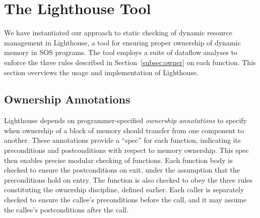 \section{The Lighthouse Tool}
\label{sec:alg}

We have instantiated our approach to static checking of dynamic
resource management in Lighthouse, a tool for ensuring proper
ownership of dynamic memory in SOS programs.  The tool employs a suite
of dataflow analyses to enforce the three rules described in
Section~\ref{subsec:owner} on each function.  
This section overviews the usage and implementation of Lighthouse.





\subsection{Ownership Annotations}

Lighthouse depends on programmer-specified 
{\em ownership annotations} to specify when ownership of a block of
memory should transfer from one component to another.
%
These annotations provide a ``spec'' for each function,
indicating its preconditions and postconditions with respect to memory
ownership.  This spec then enables precise modular checking of functions.  Each
function body is checked to ensure the postconditions on exit, under the
assumption that the preconditions hold on entry.  The function is also
checked to obey the three rules constituting the ownership discipline,
defined earlier.  Each
caller is separately checked to ensure the callee's preconditions
before the call, and
it may assume the callee's postconditions after the call.

